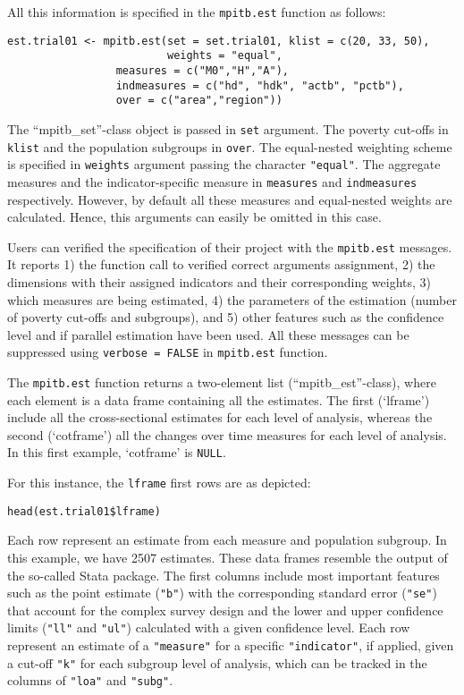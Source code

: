 All this information is specified in the \texttt{mpitb.est} function as
follows:

\begin{verbatim}
est.trial01 <- mpitb.est(set = set.trial01, klist = c(20, 33, 50),
                         weights = "equal", 
                 measures = c("M0","H","A"), 
                 indmeasures = c("hd", "hdk", "actb", "pctb"),
                 over = c("area","region"))
\end{verbatim}

The ``mpitb\_set''-class object is passed in \texttt{set} argument. The poverty
cut-offs in \texttt{klist} and the population subgroups in \texttt{over}. The
equal-nested weighting scheme is specified in \texttt{weights} argument passing
the character \texttt{"equal"}. The aggregate measures and the
indicator-specific measure in \texttt{measures} and \texttt{indmeasures} respectively.
However, by default all these measures and equal-nested weights are
calculated. Hence, this arguments can easily be omitted in this case.

Users can verified the specification of their project with the
\texttt{mpitb.est} messages. It reports 1) the function call to verified correct
arguments assignment, 2) the dimensions with their assigned
indicators and their corresponding weights, 3) which measures are being
estimated, 4) the parameters of the estimation (number of poverty cut-offs and
subgroups), and 5) other features such as the confidence level and if
parallel estimation have been used. All these messages can be suppressed
using \texttt{verbose\ =\ FALSE} in \texttt{mpitb.est} function.

The \texttt{mpitb.est} function returns a two-element list (``mpitb\_est''-class),
where each element is a data frame containing all the estimates. The
first (`lframe') include all the cross-sectional estimates for each
level of analysis, whereas the second (`cotframe') all the changes over
time measures for each level of analysis. In this first example,
`cotframe' is \texttt{NULL}.

For this instance, the \texttt{lframe} first rows are as depicted:

\begin{verbatim}
head(est.trial01$lframe)
\end{verbatim}

Each row represent an estimate from each measure and population subgroup. In this example, we have 2507 estimates.
These data frames resemble the output of the so-called Stata package.
The first columns include most important features such as the point
estimate (\texttt{"b"}) with the corresponding standard error (\texttt{"se"}) that
account for the complex survey design and the lower and upper confidence
limits (\texttt{"ll"} and \texttt{"ul"}) calculated with a given confidence level.
Each row represent an estimate of a \texttt{"measure"} for a specific
\texttt{"indicator"}, if applied, given a cut-off \texttt{"k"} for each subgroup level
of analysis, which can be tracked in the columns of \texttt{"loa"} and
\texttt{"subg"}.

